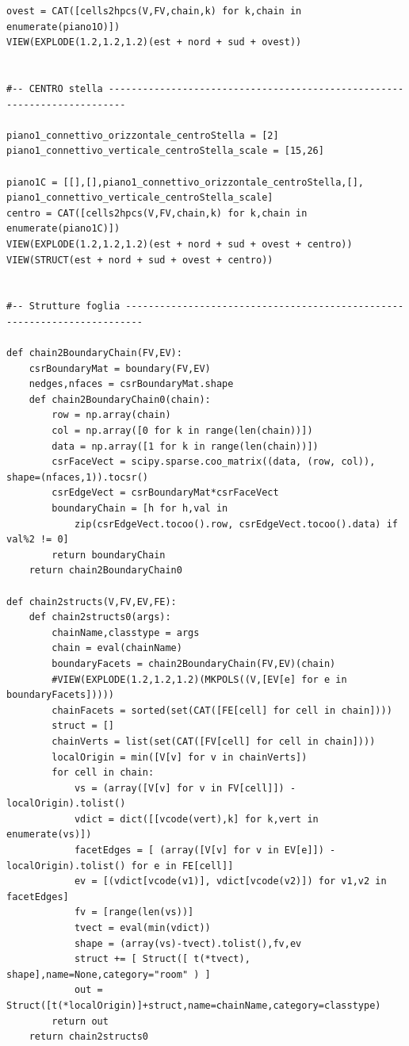 \documentclass[11pt, oneside]{article}   	%
\begin{document}
\begin{verbatim}
ovest = CAT([cells2hpcs(V,FV,chain,k) for k,chain in enumerate(piano1O)])
VIEW(EXPLODE(1.2,1.2,1.2)(est + nord + sud + ovest))


#-- CENTRO stella -------------------------------------------------------------------------

piano1_connettivo_orizzontale_centroStella = [2]
piano1_connettivo_verticale_centroStella_scale = [15,26]

piano1C = [[],[],piano1_connettivo_orizzontale_centroStella,[], piano1_connettivo_verticale_centroStella_scale]
centro = CAT([cells2hpcs(V,FV,chain,k) for k,chain in enumerate(piano1C)])
VIEW(EXPLODE(1.2,1.2,1.2)(est + nord + sud + ovest + centro))
VIEW(STRUCT(est + nord + sud + ovest + centro))


#-- Strutture foglia -------------------------------------------------------------------------

def chain2BoundaryChain(FV,EV):
    csrBoundaryMat = boundary(FV,EV)
    nedges,nfaces = csrBoundaryMat.shape   
    def chain2BoundaryChain0(chain):
        row = np.array(chain)
        col = np.array([0 for k in range(len(chain))])
        data = np.array([1 for k in range(len(chain))])
        csrFaceVect = scipy.sparse.coo_matrix((data, (row, col)), shape=(nfaces,1)).tocsr()
        csrEdgeVect = csrBoundaryMat*csrFaceVect
        boundaryChain = [h for h,val in 
            zip(csrEdgeVect.tocoo().row, csrEdgeVect.tocoo().data) if val%2 != 0]
        return boundaryChain
    return chain2BoundaryChain0
 
def chain2structs(V,FV,EV,FE):
    def chain2structs0(args): 
        chainName,classtype = args
        chain = eval(chainName)
        boundaryFacets = chain2BoundaryChain(FV,EV)(chain)
        #VIEW(EXPLODE(1.2,1.2,1.2)(MKPOLS((V,[EV[e] for e in boundaryFacets]))))
        chainFacets = sorted(set(CAT([FE[cell] for cell in chain])))
        struct = []
        chainVerts = list(set(CAT([FV[cell] for cell in chain])))
        localOrigin = min([V[v] for v in chainVerts])
        for cell in chain:
            vs = (array([V[v] for v in FV[cell]]) - localOrigin).tolist()
            vdict = dict([[vcode(vert),k] for k,vert in enumerate(vs)])
            facetEdges = [ (array([V[v] for v in EV[e]]) - localOrigin).tolist() for e in FE[cell]]
            ev = [(vdict[vcode(v1)], vdict[vcode(v2)]) for v1,v2 in facetEdges]
            fv = [range(len(vs))]
            tvect = eval(min(vdict))
            shape = (array(vs)-tvect).tolist(),fv,ev
            struct += [ Struct([ t(*tvect), shape],name=None,category="room" ) ]
            out = Struct([t(*localOrigin)]+struct,name=chainName,category=classtype)
        return out
    return chain2structs0





\end{verbatim}
\end{document}
